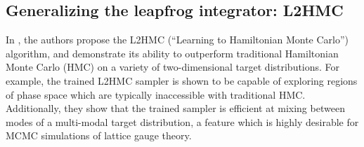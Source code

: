 \documentclass{article} %
\begin{document}
\subsection{\label{sec:l2hmc}Generalizing the leapfrog integrator: L2HMC}
%
%
%

In \citep{levy2017}, the authors propose the L2HMC (``Learning to Hamiltonian Monte Carlo'') algorithm, and demonstrate
its ability to outperform traditional Hamiltonian Monte Carlo (HMC) on a variety of two-dimensional target
distributions.
%
For example, the trained L2HMC sampler is shown to be capable of exploring regions of phase space which are typically
inaccessible with traditional HMC.\@
%
Additionally, they show that the trained sampler is efficient at mixing between modes of a multi-modal target
distribution, a feature which is highly desirable for MCMC simulations of lattice gauge theory.
%
\end{document}
